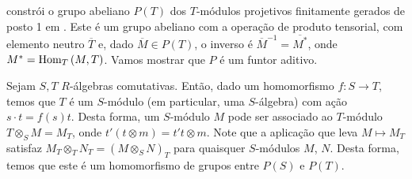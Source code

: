 \citeauthor{bourbaki} constrói o grupo abeliano $P(T)$ dos $T$-módulos projetivos finitamente gerados de posto 1 em \cite[II,.]{bourbaki}. Este é um grupo abeliano com a operação de produto tensorial, com elemento neutro $\overline{T}$ e, dado $\overline{M} \in P(T)$, o inverso é $\overline{M}^{-1} = \overline{M^*}$, onde $M^* = \textrm{Hom}_{T}\left( M,T \right)$. Vamos mostrar que $P$ é um funtor aditivo.\par
Sejam $S, T$ $R$-álgebras comutativas. Então, dado um homomorfismo $f: S \rightarrow T$, temos que $T$ é um $S$-módulo (em particular, uma $S$-álgebra) com ação $s\cdot t = f(s)t$. Desta forma, um $S$-módulo $M$ pode ser associado ao $T$-módulo $T\otimes_S M = M_T$, onde $t' (t\otimes m) = t't \otimes m$. Note que a aplicação que leva $M \mapsto M_T$ satisfaz $M_T \otimes_T N_T = (M \otimes_S N)_T$ para quaisquer $S$-módulos $M$, $N$. Desta forma, temos que este é um homomorfismo de grupos entre $P(S)$ e $P(T)$. \par
